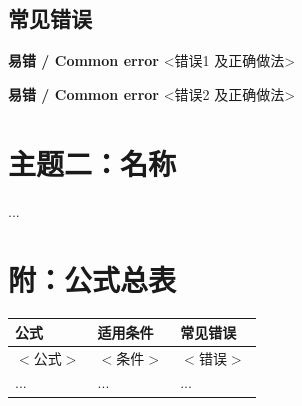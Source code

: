 \documentclass[11pt,a4paper]{article}
\newcommand{\warn}[1]{\par\vspace{3pt}\noindent
  {\colorbox{warnbg}{\textcolor{bad}{\sffamily\bfseries 易错 / Common error}}\hspace{3pt}}%
  #1\par}
\begin{document}
\subsection{常见错误}
\warn{<错误1 及正确做法>}
\warn{<错误2 及正确做法>}

\section{主题二：名称}
...

\section*{附：公式总表}
\begin{center}
\begin{tabular}{@{}p{0.32\linewidth}p{0.32\linewidth}p{0.32\linewidth}@{}}
\toprule
\textbf{公式} & \textbf{适用条件} & \textbf{常见错误} \\
\midrule
$<公式>$ & $<条件>$ & $<错误>$ \\
... & ... & ... \\
\bottomrule
\end{tabular}
\end{center}
\end{document}
